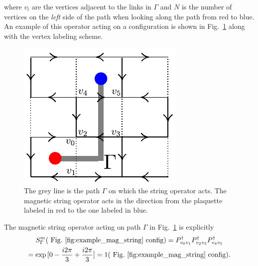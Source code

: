 \documentclass[twocolumn,prb,aps,floatfix,superscriptaddress]{revtex4-1}
\begin{document}
            where $v_l$ are the vertices adjacent to the links in $\Gamma$ and $N$ is the number of
            vertices
            on the \textit{left} side of the path when looking along the path from red to blue. 
            An example of this operator acting
            on a configuration is shown in Fig.~\ref{fig:example_mag_string} along with the vertex labeling
            scheme.
            \begin{figure}[htpb]
                \centering
                \includegraphics[width=0.8\linewidth]{example_mag_string.pdf}
                \caption{The grey line is the path $\Gamma$ on which the string operator acts. The magnetic
                    string operator acts in the 
                    direction from the plaquette labeled in red to the one labeled in blue.}
                \label{fig:example_mag_string}
            \end{figure}
            The magnetic string operator acting on path $\Gamma$ in Fig.~\ref{fig:example_mag_string} is
            explicitly
            \begin{multline}
                S^m_{\Gamma} (\mathrm{~Fig.~\ref{fig:example_mag_string}~config})
                = P_{v_0v_1}^\dagger P_{v_2v_3}^\dagger P_{v_4v_5}^\dagger
                \\
                = \exp{[0 - \frac{i2\pi}{3} + \frac{i2\pi}{3} ]} 
                = 1 (\mathrm{~Fig.~\ref{fig:example_mag_string}~config})
                .
            \end{multline}
\end{document}

